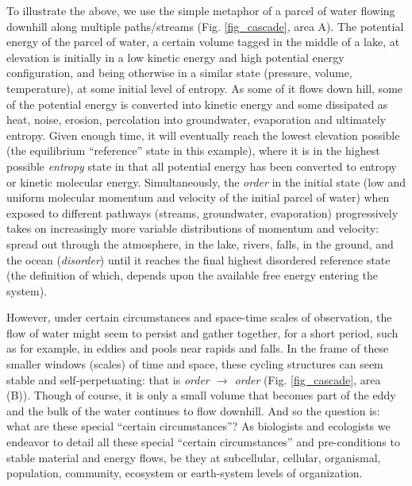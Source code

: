 \documentclass[11pt,letterpaper,]{paper}
\begin{document}
To illustrate the above, we use the simple metaphor of a parcel of water
flowing downhill along multiple paths/streams (Fig. \ref{fig_cascade},
area A). The potential energy of the parcel of water, a certain volume
tagged in the middle of a lake, at elevation is initially in a low
kinetic energy and high potential energy configuration, and being
otherwise in a similar state (pressure, volume, temperature), at some
initial level of entropy. As some of it flows down hill, some of the
potential energy is converted into kinetic energy and some dissipated as
heat, noise, erosion, percolation into groundwater, evaporation and
ultimately entropy. Given enough time, it will eventually reach the
lowest elevation possible (the equilibrium ``reference'' state in this
example), where it is in the highest possible \emph{entropy} state in
that all potential energy has been converted to entropy or kinetic
molecular energy. Simultaneously, the \emph{order} in the initial state
(low and uniform molecular momentum and velocity of the initial parcel
of water) when exposed to different pathways (streams, groundwater,
evaporation) progressively takes on increasingly more variable
distributions of momentum and velocity: spread out through the
atmosphere, in the lake, rivers, falls, in the ground, and the ocean
(\emph{disorder}) until it reaches the final highest disordered
reference state (the definition of which, depends upon the available
free energy entering the system).

However, under certain circumstances and space-time scales of
observation, the flow of water might seem to persist and gather
together, for a short period, such as for example, in eddies and pools
near rapids and falls. In the frame of these smaller windows (scales) of
time and space, these cycling structures can seem stable and
self-perpetuating: that is \emph{order \(\rightarrow\) order} (Fig.
\ref{fig_cascade}, area (B)). Though of course, it is only a small
volume that becomes part of the eddy and the bulk of the water continues
to flow downhill. And so the question is: what are these special
``certain circumstances''? As biologists and ecologists we endeavor to
detail all these special ``certain circumstances'' and pre-conditions to
stable material and energy flows, be they at subcellular, cellular,
organismal, population, community, ecosystem or earth-system levels of
organization.
\end{document}
